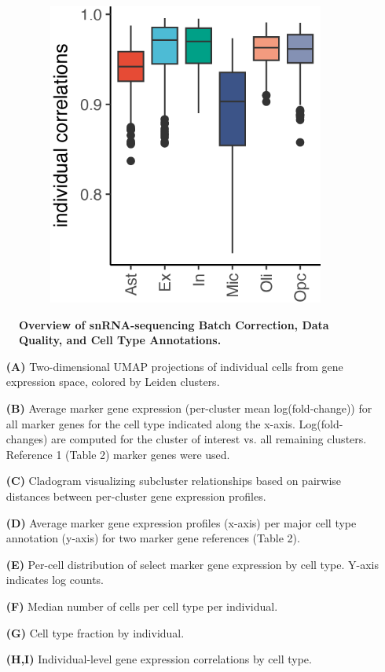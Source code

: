 \begin{figure}[H]
\begin{subfigure}[t]{.2\textwidth}
        \includegraphics[width=\textwidth]{./extended_plots/individual_correlations.png}        
    \end{subfigure}       
    \caption{
        \textbf{Overview of snRNA-sequencing Batch Correction, Data Quality, and Cell Type Annotations.}\\
    }
    \label{fig:snRNA_quality_annotation}
\end{figure}
\begin{itemize}
    \item[\textbf{(A)}] Two-dimensional UMAP projections of individual cells from gene expression space, colored by Leiden clusters. 
    \item[\textbf{(B)}] Average marker gene expression (per-cluster mean log(fold-change)) for all marker genes for the cell type indicated along the x-axis. Log(fold-changes) are computed for the cluster of interest vs. all remaining clusters. Reference 1 (Table 2) marker genes were used. 
    \item[\textbf{(C)}] Cladogram visualizing subcluster relationships based on pairwise distances between per-cluster gene expression profiles. 
    \item[\textbf{(D)}] Average marker gene expression profiles (x-axis) per major cell type annotation (y-axis) for two marker gene references (Table 2). 
    \item[\textbf{(E)}] Per-cell distribution of select marker gene expression by cell type. Y-axis indicates log counts. 
    \item[\textbf{(F)}] Median number of cells per cell type per individual. 
    \item[\textbf{(G)}] Cell type fraction by individual. 
    \item[\textbf{(H,I)}] Individual-level gene expression correlations by cell type. 
\end{itemize}
